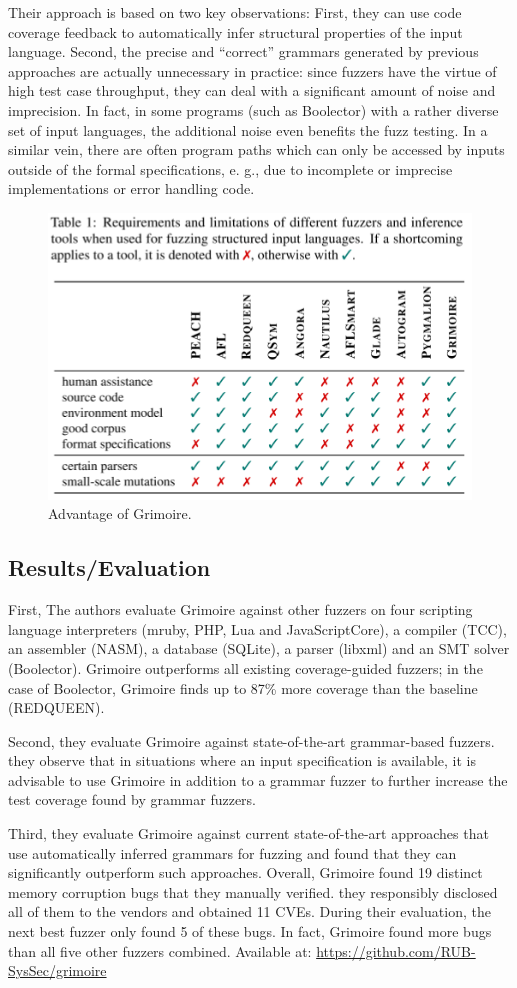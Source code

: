  Their approach is based on two key observations: First, they can use code coverage feedback to automatically infer structural properties of the input language. Second, the precise and “correct” grammars generated by previous approaches are actually unnecessary in practice: since fuzzers have the virtue of high test case throughput, they can deal with a significant amount of noise and imprecision. In fact, in some programs (such as Boolector) with a rather diverse set of input languages, the additional noise even benefits the fuzz testing. In a similar vein, there are often program paths which can only be accessed by inputs outside of the formal specifications, e. g., due to incomplete or imprecise implementations or error handling code.
\begin{figure}[h]
    \centering
    \includegraphics[width=0.6\linewidth]{grimoire.png} %
    \caption{Advantage of Grimoire.}	
    \label{fig:grimoire}
\end{figure}
\subsection{Results/Evaluation}
 First, The authors evaluate Grimoire against other fuzzers on four scripting language interpreters (mruby, PHP, Lua and JavaScriptCore), a compiler (TCC), an assembler (NASM), a database (SQLite), a parser (libxml) and an SMT solver (Boolector).  Grimoire outperforms all existing coverage-guided fuzzers; in the case of Boolector, Grimoire finds up to 87\% more coverage than the baseline (REDQUEEN). 

 Second, they evaluate Grimoire against state-of-the-art grammar-based fuzzers. they observe that in situations where an input specification is available, it is advisable to use Grimoire in addition to a grammar fuzzer to further increase the test coverage found by grammar fuzzers.
 
 Third, they evaluate Grimoire against current state-of-the-art approaches that use automatically inferred grammars for fuzzing and found that they can significantly outperform such approaches. Overall, Grimoire found 19 distinct memory corruption bugs that they manually verified. they responsibly disclosed all of them to the vendors and obtained 11 CVEs. During their evaluation, the next best fuzzer only found 5 of these bugs. In fact, Grimoire found more bugs than all five other fuzzers combined. Available at: \url{https://github.com/RUB-SysSec/grimoire}
